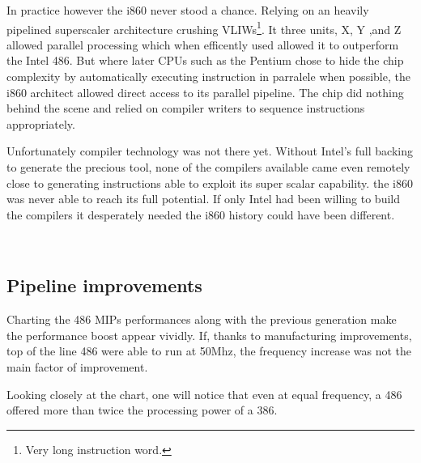 \bigskip
\par
In practice however the i860 never stood a chance. Relying on an heavily pipelined superscaler architecture crushing VLIWs\footnote{Very long instruction word.}. It three units, X, Y ,and Z allowed parallel processing which when efficently used allowed it to outperform the Intel 486.
But where later CPUs such as the Pentium chose to hide the chip complexity by automatically executing instruction in parralele when possible, the i860 architect allowed direct access to its parallel pipeline. The chip did nothing behind the scene and relied on compiler writers to sequence instructions appropriately.\\
\par
Unfortunately compiler technology was not there yet. Without Intel's full backing to generate the precious tool, none of the compilers available came even remotely close to generating instructions able to exploit its super scalar capability. the i860 was never able to reach its full potential. If only Intel had been willing to build the compilers it desperately needed the i860 history could have been different.\\
\par
\par
{}\\
\par
{}

\par
\subsection{Pipeline improvements}
Charting the 486 MIPs performances along with the previous generation make the performance boost appear vividly. If, thanks to manufacturing improvements, top of the line 486 were able to run at 50Mhz, the frequency increase was not the main factor of improvement.\\
\par
 Looking closely at the chart, one will notice that even at equal frequency, a 486 offered more than twice the processing power of a 386.\\

